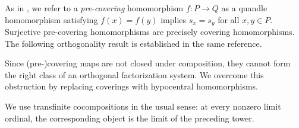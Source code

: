 As in \cite[Definition 3.20]{preprint_yuki_tomoki_2026_relativization_of_symmetries_on_quandles}, we refer to a \emph{pre-covering} homomorphism $f\colon P\to Q$ as a quandle homomorphism satisfying $f(x) = f(y)$ implies $s_x=s_y$ for all $x,y\in P$. Surjective pre-covering homomorphisms are precisely covering homomorphisms.
The following orthogonality result is established in the same reference.



Since (pre-)covering maps are not closed under composition, they cannot form the right class of an orthogonal factorization system. We overcome this obstruction by replacing coverings with hypocentral homomorphisms.

We use transfinite cocompositions in the usual sense: at every nonzero limit ordinal, the corresponding object is the limit of the preceding tower.

